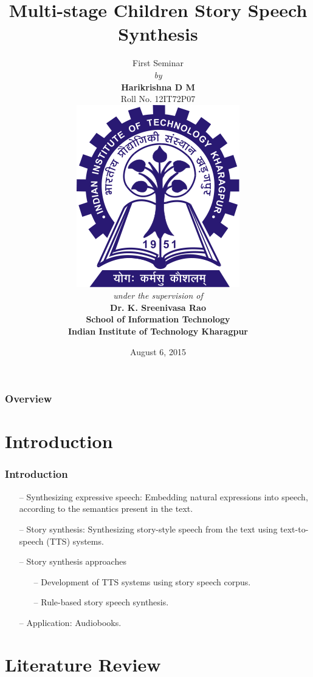 \documentclass{beamer}
\title[First Seminar]{Multi-stage Children Story Speech Synthesis}
\author[Harikrishna D M]{
{\footnotesize{First Seminar} \\ 
{\textit{by}} \\ 
\textbf{{Harikrishna D M}} \\
{Roll No. 12IT72P07}\\ \vspace*{3mm}
\includegraphics[width=0.1\linewidth]{figures/iit_kgp_80} \\ \vspace*{3mm} %
{\textit{under the supervision of}}\\ \vspace*{2mm}
\textbf{{Dr. K. Sreenivasa Rao}} \\ \vspace*{1mm}
{\bf{School of Information Technology\\ Indian Institute of Technology Kharagpur}}
}
}
\date{August 6, 2015} %
\begin{document}
\begin{frame}
\titlepage %
\end{frame}

\begin{frame}
\frametitle{Overview} 
\tableofcontents 
\end{frame}


\section{Introduction} \label{Introduction}


\begin{frame}
\frametitle{Introduction}
\begin{itemize}

\item[--] Synthesizing expressive speech: Embedding natural expressions into speech, according to the semantics present in the text.
\item[--] Story synthesis: Synthesizing story-style speech from the text using text-to-speech (TTS) systems. 
\item[--] Story synthesis approaches 
\begin{itemize}
\item[--] Development of TTS systems using story speech corpus.
\item[--] Rule-based story speech synthesis.
\end{itemize}

\item[--] Application: Audiobooks.

\end{itemize}


\end{frame}





\section{Literature Review}
\end{document}
